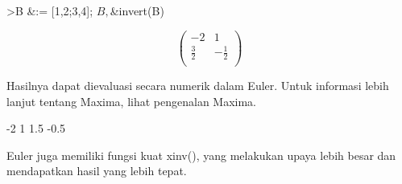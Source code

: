 \documentclass[a4paper,10pt]{article}
\begin{document}
\begin{eulernotebook}
\begin{eulercomment}
\begin{eulercomment}
\begin{eulercomment}
\begin{eulercomment}
\begin{eulercomment}
\begin{eulercomment}
\begin{eulerttcomment}
\end{eulerttcomment}
\begin{eulerprompt}
>B &:= [1,2;3,4]; $B, $&invert(B)
\end{eulerprompt}
\begin{eulerformula}
\[
\begin{pmatrix}-2 & 1 \\ \frac{3}{2} & -\frac{1}{2} \\   \end{pmatrix}
\]
\end{eulerformula}
\begin{eulercomment}
Hasilnya dapat dievaluasi secara numerik dalam Euler. Untuk informasi
lebih lanjut tentang Maxima, lihat pengenalan Maxima.
\end{eulercomment}
\begin{euleroutput}
             -2             1 
            1.5          -0.5 
\end{euleroutput}
\begin{eulercomment}
Euler juga memiliki fungsi kuat xinv(), yang melakukan upaya lebih
besar dan mendapatkan hasil yang lebih tepat.


\end{eulercomment}
\end{eulercomment}
\end{eulercomment}
\end{eulercomment}
\end{eulercomment}
\end{eulercomment}
\end{eulercomment}
\end{eulernotebook}
\end{document}
